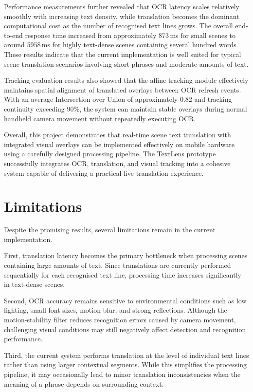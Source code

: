 Performance measurements further revealed that OCR latency scales relatively smoothly with increasing text density, while translation becomes the dominant computational cost as the number of recognised text lines grows. The overall end-to-end response time increased from approximately 873\,ms for small scenes to around 5958\,ms for highly text-dense scenes containing several hundred words. These results indicate that the current implementation is well suited for typical scene translation scenarios involving short phrases and moderate amounts of text.

Tracking evaluation results also showed that the affine tracking module effectively maintains spatial alignment of translated overlays between OCR refresh events. With an average Intersection over Union of approximately 0.82 and tracking continuity exceeding 90\%, the system can maintain stable overlays during normal handheld camera movement without repeatedly executing OCR.

Overall, this project demonstrates that real-time scene text translation with integrated visual overlays can be implemented effectively on mobile hardware using a carefully designed processing pipeline. The TextLens prototype successfully integrates OCR, translation, and visual tracking into a cohesive system capable of delivering a practical live translation experience.

\section{Limitations}

Despite the promising results, several limitations remain in the current implementation.

First, translation latency becomes the primary bottleneck when processing scenes containing large amounts of text. Since translations are currently performed sequentially for each recognised text line, processing time increases significantly in text-dense scenes.

Second, OCR accuracy remains sensitive to environmental conditions such as low lighting, small font sizes, motion blur, and strong reflections. Although the motion-stability filter reduces recognition errors caused by camera movement, challenging visual conditions may still negatively affect detection and recognition performance.

Third, the current system performs translation at the level of individual text lines rather than using larger contextual segments. While this simplifies the processing pipeline, it may occasionally lead to minor translation inconsistencies when the meaning of a phrase depends on surrounding context.

